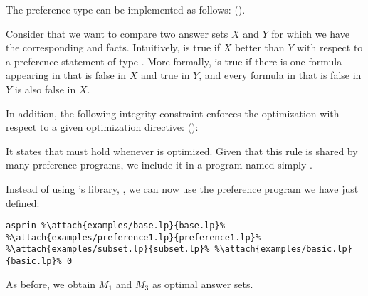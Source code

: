 \begin{example}
The preference type  can be implemented as follows:
().
%

%
Consider that we want to compare two answer sets $X$ and $Y$
for which we have the corresponding  and  facts. 
Intuitively,  is true if $X$ better than $Y$ with respect to a preference statement  
of type . 
More formally, 
 is true if there is one formula  appearing in  that is false in $X$ and true in $Y$, 
and every formula  in  that is false in $Y$ is also false in $X$.  

In addition, 
the following integrity constraint enforces the optimization with respect to a given optimization directive:
():
%

%
It states that  must hold whenever  is optimized. 
Given that this rule is shared by many preference programs, 
we include it in a program named simply .

Instead of using \asprin's library, , 
we can now use the preference program we have just defined:
\begin{lstlisting}[numbers=none,escapechar=\%]
asprin %\attach{examples/base.lp}{base.lp}% %\attach{examples/preference1.lp}{preference1.lp}% %\attach{examples/subset.lp}{subset.lp}% %\attach{examples/basic.lp}{basic.lp}% 0
\end{lstlisting}
As before, we obtain $M_1$ and $M_3$ as optimal answer sets.
\end{example}

